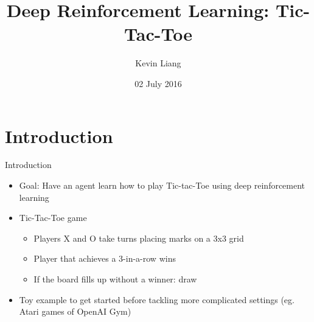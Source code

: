 \documentclass[11pt]{beamer}
\title[CLGP]{Deep Reinforcement Learning: Tic-Tac-Toe }
\author[Liang]{Kevin Liang}
\institute[Duke University]{Duke University}
\date{02 July 2016}
\begin{document}
\begin{frame}
\maketitle
\end{frame}



\section{Introduction}

\begin{frame}{Introduction}
	\begin{itemize}
	
		\item Goal: Have an agent learn how to play Tic-tac-Toe using deep reinforcement learning 
		\item Tic-Tac-Toe game
		\begin{itemize}
			\item Players X and O take turns placing marks on a 3x3 grid
			\item Player that achieves a 3-in-a-row wins
			\item If the board fills up without a winner: draw
		\end{itemize}
		\item Toy example to get started before tackling more complicated settings (eg. Atari games of OpenAI Gym)
		
	\end{itemize}
\end{frame}
\end{document}

